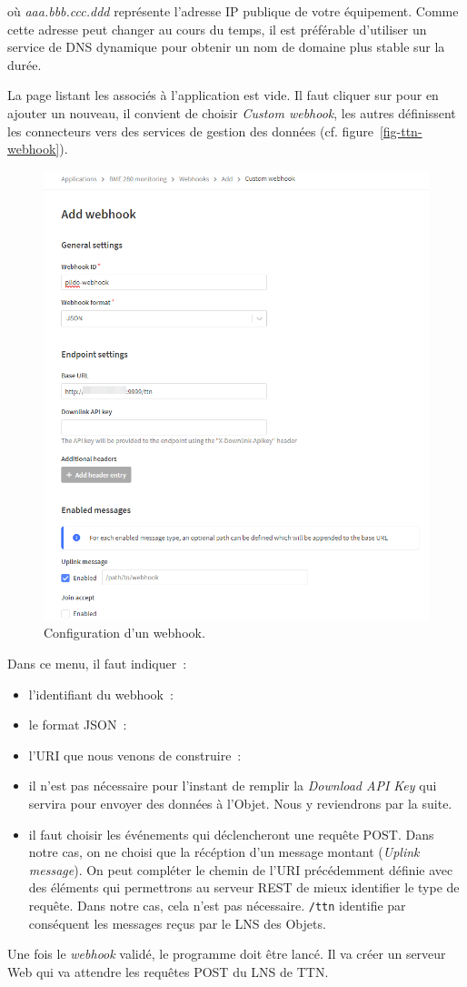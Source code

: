 \noindent où \textit{aaa.bbb.ccc.ddd} représente l'adresse IP publique de votre équipement. Comme cette adresse peut changer au cours du temps, il est préférable d'utiliser un service de DNS dynamique pour obtenir un nom de domaine plus stable sur la durée.

         \vspace{1em}

La page listant les \textit{} associés à l'application est vide. Il faut cliquer sur \textit{} pour en ajouter un nouveau, il convient de choisir \textit{Custom webhook}, les autres définissent les connecteurs vers des services de gestion des données (cf. figure~\vref{fig-ttn-webhook}).

\begin{figure}[tbp]
\centerline{\includegraphics[width=.7\columnwidth]{Pictures/ttn-webhook.png} }
\caption{Configuration d'un webhook.}
\label{fig-ttn-webhook}
\end{figure}

Dans ce menu, il faut indiquer~:
\begin{itemize}
    \item l'identifiant du webhook~:
    \item le format JSON~:
    \item l'URI que nous venons de construire~:
    \item il n'est pas nécessaire pour l'instant de remplir la \textit{Download API Key} qui servira pour envoyer des données à l'Objet. Nous y reviendrons par la suite.
    \item il faut choisir les événements qui déclencheront une requête POST. Dans notre cas, on ne choisi que la récéption d'un message montant (\textit{Uplink message}).  On peut compléter le chemin de l'URI précédemment définie avec des éléments qui permettrons au serveur REST de mieux identifier le type de requête. Dans notre cas, cela n'est pas nécessaire. \texttt{/ttn} identifie par conséquent les messages reçus par le LNS des Objets.
\end{itemize}
Une fois le \textit{webhook} validé, le programme  doit être lancé. Il va créer un serveur Web qui va attendre les requêtes POST du LNS de TTN.

